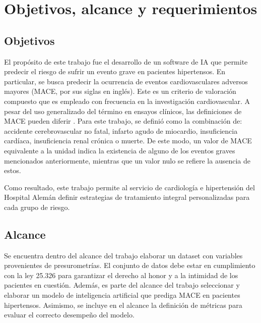 
\section{Objetivos, alcance y requerimientos}

\subsection{Objetivos}
El propósito de este trabajo fue el desarrollo de un software de IA que permite predecir el riesgo de sufrir un evento 
grave en pacientes hipertensos. En particular, se busca predecir la ocurrencia de eventos cardiovasculares adversos 
mayores (MACE, por sus siglas en inglés). Este es un criterio de valoración compuesto que es empleado con frecuencia 
en la investigación cardiovascular. A pesar del uso generalizado del término en ensayos clínicos, las definiciones de 
MACE pueden diferir \citep{CITE:10}. Para este trabajo, se definió como la combinación de: accidente cerebrovascular no 
fatal, infarto agudo de miocardio, insuficiencia cardíaca, insuficiencia renal crónica o muerte. De este modo, un valor 
de MACE equivalente a la unidad indica la existencia de alguno de los eventos graves mencionados anteriormente, mientras 
que un valor nulo se refiere la ausencia de estos. 

Como resultado, este trabajo permite al servicio de cardiología e hipertensión del Hospital Alemán definir estrategias 
de tratamiento integral personalizadas para cada grupo de riesgo. 

\subsection{Alcance}
Se encuentra dentro del alcance del trabajo elaborar un dataset con variables provenientes de presurometrías. El conjunto 
de datos debe estar en cumplimiento con la ley 25.326 para garantizar el derecho al honor y a la intimidad de los 
pacientes en cuestión. Además, es parte del alcance del trabajo seleccionar y elaborar un modelo de inteligencia 
artificial que prediga MACE en pacientes hipertensos. Asimismo, se incluye en el alcance la definición de métricas 
para evaluar el correcto desempeño del modelo.

